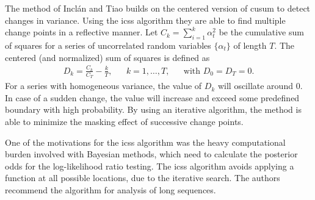 The method of Incl\'{a}n and Tiao \cite{inclan1994use} builds on the centered version of \gls{cusum} \cite{brown1975techniques} to detect changes in variance.
Using the \gls{icss} algorithm they are able to find multiple change points in a reflective manner.
Let $C_k = \sum_{i=1}^k \alpha_t^2$ be the cumulative sum of squares for a series of uncorrelated random variables $\{\alpha_t\}$ of length $T$.
The centered (and normalized) sum of squares is defined as
\begin{equation}
  \begin{aligned}
  D_k = \frac{C_k}{C_T} - \frac{k}{T}, & & k = 1, \dots, T, & & \text{with } D_0 = D_T = 0.
  \end{aligned}
\end{equation}
For a series with homogeneous variance, the value of $D_k$ will oscillate around $0$.
In case of a sudden change, the value will increase and exceed some predefined boundary with high probability.
By using an iterative algorithm, the method is able to minimize the masking effect of successive change points.

One of the motivations for the \gls{icss} algorithm was the heavy computational burden involved with Bayesian methods, which need to calculate the posterior odds for the log-likelihood ratio testing.
The \gls{icss} algorithm avoids applying a function at all possible locations, due to the iterative search.
The authors recommend the algorithm for analysis of long sequences.
